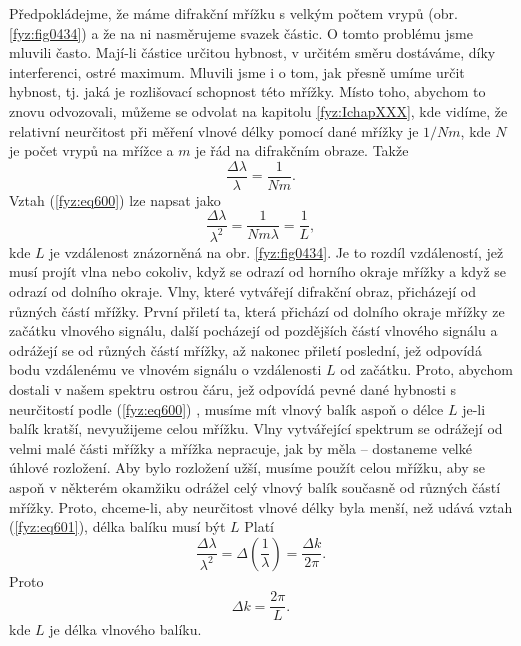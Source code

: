     Předpokládejme, že máme difrakční mřížku s velkým počtem vrypů (obr. \ref{fyz:fig0434}) a že na
    ni nasměrujeme svazek částic. O tomto problému jsme mluvili často. Mají-li částice určitou
    hybnost, v určitém směru dostáváme, díky interferenci, ostré maximum. Mluvili jsme i o tom, jak
    přesně umíme určit hybnost, tj. jaká je rozlišovací schopnost této mřížky. Místo toho, abychom
    to znovu odvozovali, můžeme se odvolat na kapitolu \ref {fyz:IchapXXX}, kde vidíme, že relativní
    neurčitost při měření vlnové délky pomocí dané mřížky je \(1/Nm\), kde \(N\) je počet vrypů na
    mřížce a \(m\) je řád na difrakčním obraze. Takže
    \begin{equation}\label{fyz:eq600}
      \frac{Δλ}{λ}=\frac{1}{Nm}.
    \end{equation}
    Vztah (\ref{fyz:eq600}) lze napsat jako
    \begin{equation}\label{fyz:eq601}
      \frac{Δλ}{λ^2} = \frac{1}{Nmλ} = \frac{1}{L},
    \end{equation} 
    kde \(L\) je vzdálenost znázorněná na obr. \ref{fyz:fig0434}. Je to rozdíl vzdáleností, jež musí
    projít vlna nebo cokoliv, když se odrazí od horního okraje mřížky a když se odrazí od dolního
    okraje. Vlny, které vytvářejí difrakční obraz, přicházejí od různých částí mřížky. První přiletí
    ta, která přichází od dolního okraje mřížky ze začátku vlnového signálu, další pocházejí od
    pozdějších částí vlnového signálu a odrážejí se od různých částí mřížky, až nakonec přiletí
    poslední, jež odpovídá bodu vzdálenému ve vlnovém signálu o vzdálenosti \(L\) od začátku. Proto,
    abychom dostali v našem spektru ostrou čáru, jež odpovídá pevné dané hybnosti s neurčitostí
    podle (\ref{fyz:eq600}) , musíme mít vlnový balík aspoň o délce \(L\) je-li balík kratší,
    nevyužijeme celou mřížku. Vlny vytvářející spektrum se odrážejí od velmi malé části mřížky a
    mřížka nepracuje, jak by měla – dostaneme velké úhlové rozložení. Aby bylo rozložení užší,
    musíme použít celou mřížku, aby se aspoň v některém okamžiku odrážel celý vlnový balík současně
    od různých částí mřížky. Proto, chceme-li, aby neurčitost vlnové délky byla menší, než udává
    vztah (\ref{fyz:eq601}), délka balíku musí být \(L\) Platí   
    \begin{equation*}
      \frac{Δλ}{λ^2} = Δ\left(\frac{1}{λ}\right)=\frac{Δk}{2π}.
    \end{equation*} 
    Proto
    \begin{equation}\label{fyz:eq602}
      Δk=\frac{2π}{L}.
    \end{equation} 
    kde \(L\) je délka vlnového balíku.


